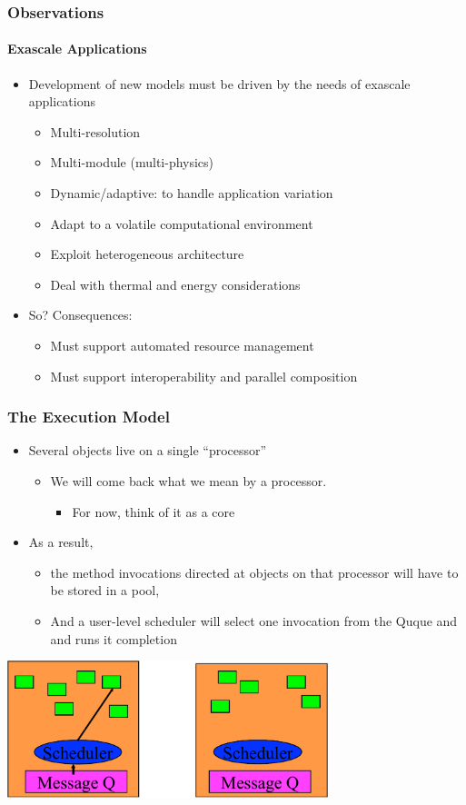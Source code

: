 \begin{frame}[t]
\frametitle{Observations}
\framesubtitle{Exascale Applications}
  \begin{itemize}
    \item Development of new models must be driven by the needs of exascale applications
    \begin{itemize}
      \item Multi-resolution
      \item Multi-module (multi-physics)
      \item Dynamic/adaptive: to handle application variation
      \item Adapt to a volatile computational environment
      \item Exploit heterogeneous architecture
      \item Deal with thermal and energy considerations
    \end{itemize}
    \pause
    \item So? Consequences:
    \begin{itemize}
      \item Must support automated resource management
      \item Must support interoperability and parallel composition
    \end{itemize}
  \end{itemize}
\end{frame}

\begin{frame}[t]
\frametitle{The Execution Model}
  \begin{itemize}
    \item Several objects live on a single ``processor”
    \begin{itemize}
      \item We will come back what we mean by a processor.
      \begin{itemize}
        \item For now, think of it as a core
      \end{itemize}
    \end{itemize}
  \item As a result, 
    \begin{itemize}
      \item the method invocations directed at objects on that processor will have to be stored in a pool,
      \item And a user-level scheduler will select one invocation from the Quque and and runs it completion
    \end{itemize}
  \end{itemize}
  \begin{center} \includegraphics[width=0.7\textwidth]{figures/scheduler} \end{center}
\end{frame}

